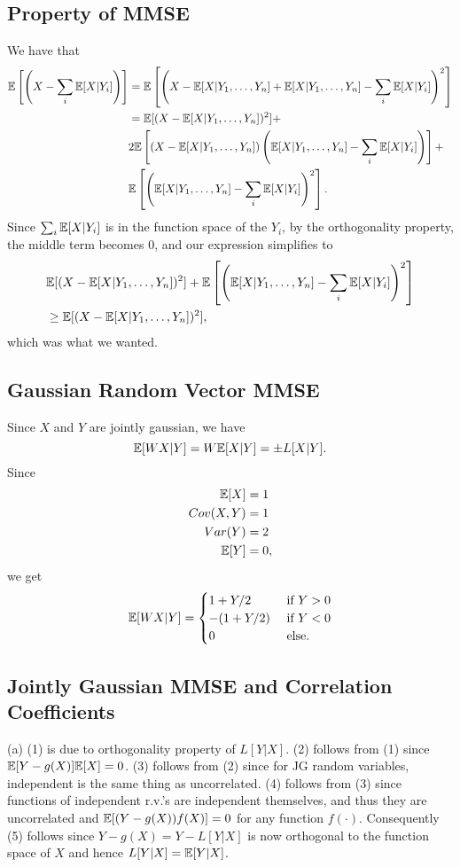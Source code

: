 \subsection{Property of MMSE}
We have that
\begin{align*}
    \mathbb{E}\left[\left(X - \sum_i\mathbb{E}[X|Y_i]\right)\right] &= \mathbb{E}\left[\left(X - \mathbb{E}[X|Y_1, \dots, Y_n] + \mathbb{E}[X|Y_1, \dots, Y_n] - \sum_i\mathbb{E}[X|Y_i]\right)^2\right] \\
        &= \mathbb{E}[(X - \mathbb{E}[X|Y_1, \dots, Y_n])^2] + \\
        &2\mathbb{E}\left[(X - \mathbb{E}[X|Y_1, \dots, Y_n])\left(\mathbb{E}[X|Y_1, \dots, Y_n] - \sum_i\mathbb{E}[X|Y_i]\right)\right] + \\
        &\mathbb{E}\left[\left(\mathbb{E}[X|Y_1, \dots, Y_n] - \sum_i\mathbb{E}[X|Y_i]\right)^2\right].
\end{align*}
Since $\sum_i\mathbb{E}[X|Y_i]$ is in the function space of the $Y_i$, by the orthogonality property, the middle term becomes 0, and our expression simplifies to
\begin{align*}
    &\mathbb{E}[(X - \mathbb{E}[X|Y_1, \dots, Y_n])^2] + \mathbb{E}\left[\left(\mathbb{E}[X|Y_1, \dots, Y_n] - \sum_i\mathbb{E}[X|Y_i]\right)^2\right] \\
    &\geq \mathbb{E}[(X - \mathbb{E}[X|Y_1, \dots, Y_n])^2],
\end{align*}
which was what we wanted.


\subsection{Gaussian Random Vector MMSE}
Since $X$ and $Y$ are jointly gaussian, we have
\[
\mathbb{E}[WX|Y] = W\mathbb{E}[X|Y] = \pm L[X|Y].
\]
Since
\begin{align*}
    \mathbb{E}[X] &= 1 \\
    Cov(X, Y) &= 1 \\
    Var(Y) &= 2 \\
    \mathbb{E}[Y] &= 0,
\end{align*}
we get
\[
    \mathbb{E}[WX|Y] = \begin{cases}
        1 + Y/2 &\text{ if } Y > 0 \\
        -(1 + Y/2) &\text{ if } Y < 0 \\
        0 &\text{ else.}
    \end{cases}
\]


\subsection{Jointly Gaussian MMSE and Correlation Coefficients}
(a) (1) is due to orthogonality property of $L[Y|X]$. (2) follows from (1) since $\mathbb{E}[Y - g(X)]\mathbb{E}[X] = 0$. (3) follows from (2) since for JG random variables, independent is the same thing as uncorrelated. (4) follows from (3) since functions of independent r.v.'s are independent themselves, and thus they are uncorrelated and $\mathbb{E}[(Y - g(X))f(X)] = 0$ for any function $f(\cdot)$. Consequently (5) follows since $Y - g(X) = Y - L[Y|X]$ is now orthogonal to the function space of $X$ and hence $L[Y|X] = \mathbb{E}[Y|X]$.

